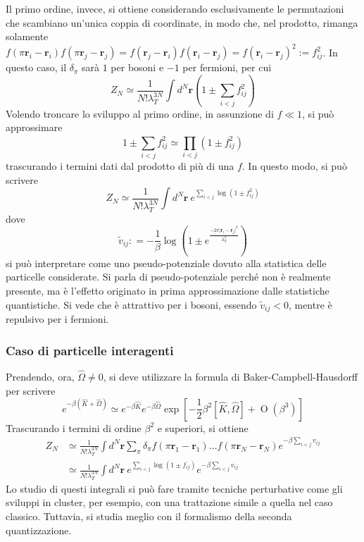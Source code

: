 \documentclass[11pt, a4paper]{scrartcl}
\theoremstyle{style}
\theoremstyle{style1}
\numberwithin{equation}{subsection}
\begin{document}
Il primo ordine, invece, si ottiene considerando esclusivamente le permutazioni che scambiano un'unica coppia di coordinate, in modo che, nel prodotto, rimanga solamente $f(\pi\mathbf{r} _i - \mathbf{r} _i ) f(\pi\mathbf{r} _j - \mathbf{r} _j ) = f(\mathbf{r} _j - \mathbf{r} _i) f(\mathbf{r} _i - \mathbf{r} _j) = f(\mathbf{r} _i - \mathbf{r} _j) ^2 := f_{ij} ^2$.
In questo caso, il $\delta _\pi$ sar\`a $1$ per bosoni e $-1$ per fermioni, per cui
\[
Z_N \simeq \frac{1}{N! \lambda _T^{3N}} \int d^N \mathbf{r}  \left(1 \pm \sum_{i<j}^{} f_{ij} ^2\right) 
\] 
Volendo troncare lo sviluppo al primo ordine, in assunzione di $f \ll 1$, si pu\`o approssimare
\[
1 \pm \sum_{i<j}^{} f_{ij} ^2 \simeq \prod_{i<j} \left(1 \pm f_{ij} ^2\right) 
\] 
trascurando i termini dati dal prodotto di pi\`u di una $f$.
In questo modo, si pu\`o scrivere
\[
	Z_N \simeq \frac{1}{N!\lambda _T^{3N}} \int d^N \mathbf{r} \ e^{ \sum_{i<j}^{} \log\left(1\pm f_{ij}^2 \right)}
\] 
dove
\[
\tilde{v}_{ij} : = -\frac{1}{\beta }\log \left(1\pm e^{\frac{-2\pi\lvert \mathbf{r} _i - \mathbf{r} _j \rvert^2 }{\lambda _T^2}}\right) 
\] 
si pu\`o interpretare come uno pseudo-potenziale dovuto alla statistica delle particelle considerate.
Si parla di pseudo-potenziale perch\'e non \`e realmente presente, ma \`e l'effetto originato in prima approssimazione dalle statistiche quantistiche.
Si vede che \`e attrattivo per i bosoni, essendo $\tilde{v}_{ij} <0$, mentre \`e repulsivo per i fermioni.
\subsubsection{Caso di particelle interagenti}
Prendendo, ora, $\hat{\Omega }\neq 0$, si deve utilizzare la formula di Baker-Campbell-Hausdorff per scrivere
\[
e^{-\beta \left(\hat{K}+\hat{\Omega }\right) }\simeq e^{-\beta \hat{K}}e^{-\beta \hat{\Omega }} \exp\left[ -\frac{1}{2}\beta ^2 \left[ \hat{K},\hat{\Omega } \right] + \operatorname{O} (\beta ^3) \right] 
\] 
Trascurando i termini di ordine $\beta ^2$ e superiori, si ottiene
\[
	\begin{split}
		Z_N &\simeq \frac{1}{N!\lambda _T^{3N}} \int d^N \mathbf{r} \sum_{\pi}^{} \delta _\pi f(\pi\mathbf{r} _1 - \mathbf{r} _1) \ldots f(\pi\mathbf{r} _N - \mathbf{r} _N) e^{-\beta \sum_{i<j}^{} v_{ij} }\\
		    &\simeq \frac{1}{N!\lambda _T^{3N}} \int d^N\mathbf{r}  \ e^{\sum_{i<j}^{} \log\left(1\pm f_{ij} \right) } e^{-\beta \sum_{i<j}^{} v_{ij} }
	\end{split}
\] 
Lo studio di questi integrali si pu\`o fare tramite tecniche perturbative come gli sviluppi in cluster, per esempio, con una trattazione simile a quella nel caso classico.
Tuttavia, si studia meglio con il formalismo della seconda quantizzazione.
\end{document}
